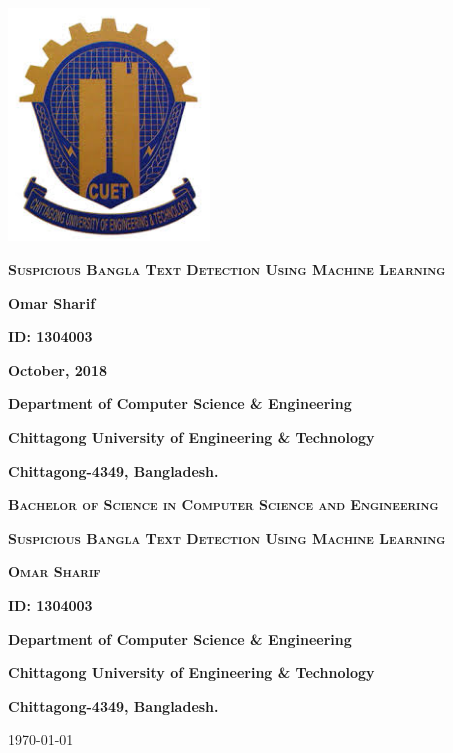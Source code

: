 \begin{titlepage}
	\centering
	\includegraphics[width=0.4\textwidth]{Figures/Logo.jpeg}\par\vspace{1cm}
	\vspace{1cm}
		{\scshape\Large\bfseries Suspicious Bangla Text Detection Using Machine Learning  \par}
	\vspace{2cm}
	 
	\textbf{Omar Sharif}\par 
	\vspace{.5cm}
	\textbf{ID: 1304003}\par 
	\vspace{3cm}
	\textbf{October, 2018}
	
	\vspace{4cm}
	{\Large\bfseries Department of Computer Science \& Engineering\par}
	{\large\bfseries Chittagong University of Engineering \& Technology\par}
	{\bfseries Chittagong-4349, Bangladesh.}

	\vfill
\end{titlepage}

\begin{titlepage}
	\centering
	{\scshape\LARGE\bfseries Bachelor of Science in Computer Science and Engineering \par}
	\vspace{7cm}
	{\scshape\Large\bfseries Suspicious Bangla Text Detection Using Machine Learning \par}
	\vspace{3cm}
	{\scshape\bfseries Omar Sharif\par}
	{\scshape\bfseries ID: 1304003\par}
	
	\vspace{8cm}
	{\bfseries Department of Computer Science \& Engineering\par}
	{\bfseries Chittagong University of Engineering \& Technology\par}
	{\bfseries Chittagong-4349, Bangladesh.}

	\vfill

	{\large \today\par}
\end{titlepage}

